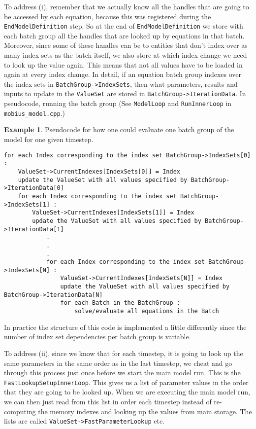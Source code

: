 \documentclass[11pt]{article}
\theoremstyle{definition}
\newtheorem{myexample}{Example}
\newenvironment{example}%
  {\begin{lrbox}{\examplebox}%
   \begin{minipage}{\dimexpr\linewidth-2\fboxsep}
   \begin{myexample}}%
  {\end{myexample}%
   \end{minipage}%
   \end{lrbox}%
   \begin{trivlist}
     \item[]\colorbox{silver}{\usebox\examplebox}
   \end{trivlist}}
\begin{document}
To address (i), remember that we actually know all the handles that are going to be accessed by each equation, because this was registered during the {\tt EndModelDefinition} step. So at the end of {\tt EndModelDefinition} we store with each batch group all the handles that are looked up by equations in that batch. Moreover, since some of these handles can be to entities that don't index over as many index sets as the batch itself, we also store at which index change we need to look up the value again. This means that not all values have to be loaded in again at every index change. In detail, if an equation batch group indexes over the index sets in {\tt BatchGroup->IndexSets}, then what parameters, results and inputs to update in the {\tt ValueSet} are stored in {\tt BatchGroup->IterationData}. In pseudocode, running the batch group (See {\tt ModelLoop} and {\tt RunInnerLoop} in {\tt mobius\_model.cpp}.)

\begin{example}
Pseudocode for how one could evaluate one batch group of the model for one given timestep.
\begin{lstlisting}[style = mycpp]
for each Index corresponding to the index set BatchGroup->IndexSets[0] :
	ValueSet->CurrentIndexes[IndexSets[0]] = Index
	update the ValueSet with all values specified by BatchGroup->IterationData[0]
	for each Index corresponding to the index set BatchGroup->IndexSets[1] :
		ValueSet->CurrentIndexes[IndexSets[1]] = Index
		update the ValueSet with all values specified by BatchGroup->IterationData[1]
			.
			.
			.
			for each Index corresponding to the index set BatchGroup->IndexSets[N] :
				ValueSet->CurrentIndexes[IndexSets[N]] = Index
				update the ValueSet with all values specified by BatchGroup->IterationData[N]
				for each Batch in the BatchGroup :
					solve/evaluate all equations in the Batch

\end{lstlisting}
In practice the structure of this code is implemented a little differently since the number of index set dependencies per batch group is variable.
\end{example}

To address (ii), since we know that for each timestep, it is going to look up the same parameters in the same order as in the last timestep, we cheat and go through this process just once before we start the main model run. This is the {\tt FastLookupSetupInnerLoop}. This gives us a list of parameter values in the order that they are going to be looked up. When we are executing the main model run, we can then just read from this list in order each timestep instead of re-computing the memory indexes and looking up the values from main storage. The lists are called {\tt ValueSet->FastParameterLookup} etc.
\end{document}
